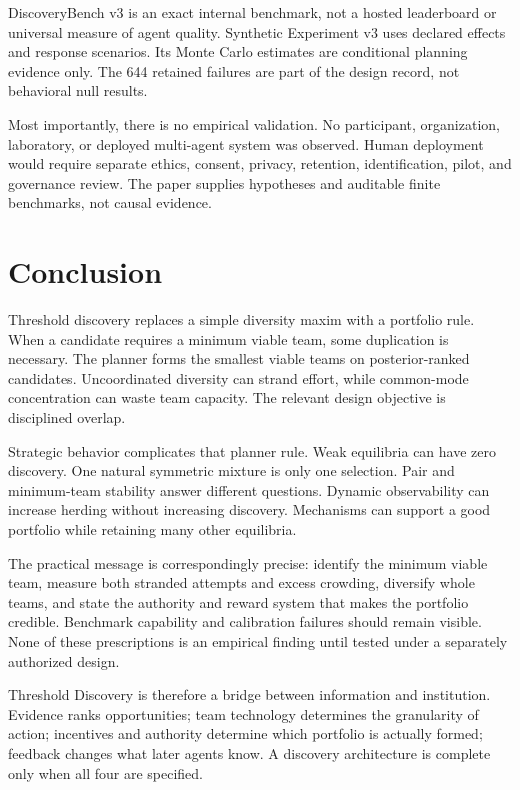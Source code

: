 \documentclass[11pt]{article}
\begin{document}
DiscoveryBench v3 is an exact internal benchmark, not a hosted leaderboard or
universal measure of agent quality. Synthetic Experiment v3 uses declared
effects and response scenarios. Its Monte Carlo estimates are conditional
planning evidence only. The 644 retained failures are part of the design record,
not behavioral null results.

Most importantly, there is no empirical validation. No participant,
organization, laboratory, or deployed multi-agent system was observed. Human
deployment would require separate ethics, consent, privacy, retention,
identification, pilot, and governance review. The paper supplies hypotheses and
auditable finite benchmarks, not causal evidence.

\section{Conclusion}

Threshold discovery replaces a simple diversity maxim with a portfolio rule.
When a candidate requires a minimum viable team, some duplication is necessary.
The planner forms the smallest viable teams on posterior-ranked candidates.
Uncoordinated diversity can strand effort, while common-mode concentration can
waste team capacity. The relevant design objective is disciplined overlap.

Strategic behavior complicates that planner rule. Weak equilibria can have zero
discovery. One natural symmetric mixture is only one selection. Pair and
minimum-team stability answer different questions. Dynamic observability can
increase herding without increasing discovery. Mechanisms can support a good
portfolio while retaining many other equilibria.

The practical message is correspondingly precise: identify the minimum viable
team, measure both stranded attempts and excess crowding, diversify whole teams,
and state the authority and reward system that makes the portfolio credible.
Benchmark capability and calibration failures should remain visible. None of
these prescriptions is an empirical finding until tested under a separately
authorized design.

Threshold Discovery is therefore a bridge between information and institution.
Evidence ranks opportunities; team technology determines the granularity of
action; incentives and authority determine which portfolio is actually formed;
feedback changes what later agents know. A discovery architecture is complete
only when all four are specified.
\end{document}
